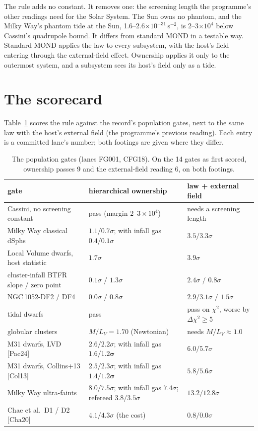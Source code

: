 \documentclass[10pt]{article}
\begin{document}
The rule adds no constant. It removes one: the screening length the programme's other readings need for the Solar System. The Sun owns no phantom, and the Milky Way's phantom tide at the Sun, 1.6--2.6$\times10^{-31}$\,s$^{-2}$, is 2--3$\times10^4$ below Cassini's quadrupole bound. It differs from standard MOND in a testable way. Standard MOND applies the law to every subsystem, with the host's field entering through the external-field effect. Ownership applies it only to the outermost system, and a subsystem sees its host's field only as a tide.

\section{The scorecard}\label{sec:score}

Table~\ref{tab:score} scores the rule against the record's population gates, next to the same law with the host's external field (the programme's previous reading). Each entry is a committed lane's number; both footings are given where they differ.

\begin{table}[h]
\centering\footnotesize
\begin{tabular}{@{}lll@{}}
\toprule
gate & hierarchical ownership & law + external field\\
\midrule
Cassini, no screening constant & pass (margin $2$--$3\times10^4$) & needs a screening length\\
Milky Way classical dSphs & $1.1/0.7\sigma$; with infall gas $0.4/0.1\sigma$ & $3.5/3.3\sigma$\\
Local Volume dwarfs, host statistic & $1.7\sigma$ & $3.9\sigma$\\
cluster-infall BTFR slope / zero point & $0.1\sigma$ / $1.3\sigma$ & $2.4\sigma$ / $0.8\sigma$\\
NGC\,1052-DF2 / DF4 & $0.0\sigma$ / $0.8\sigma$ & $2.9/3.1\sigma$ / $1.5\sigma$\\
tidal dwarfs & pass & pass on $\chi^2$, worse by $\Delta\chi^2\geq5$\\
globular clusters & $M/L_V=1.70$ (Newtonian) & needs $M/L_V\approx1.0$\\
M31 dwarfs, LVD [Pac24] & $2.6/2.2\sigma$; with infall gas $\mathbf{1.6/1.2\sigma}$ & $6.0/5.7\sigma$\\
M31 dwarfs, Collins+13 [Col13] & $2.5/2.3\sigma$; with infall gas $\mathbf{1.4/1.2\sigma}$ & $5.8/5.6\sigma$\\
Milky Way ultra-faints & $8.0/7.5\sigma$; with infall gas $7.4\sigma$; refereed $3.8/3.5\sigma$ & $13.2/12.8\sigma$\\
Chae et al.\ D1 / D2 [Cha20] & $4.1/4.3\sigma$ (the cost) & $0.8/0.0\sigma$\\
\bottomrule
\end{tabular}
\caption{The population gates (lanes FG001, CFG18). On the 14 gates as first scored, ownership passes 9 and the external-field reading 6, on both footings.}\label{tab:score}
\end{table}
\end{document}

